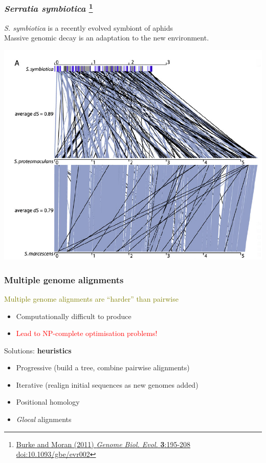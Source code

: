 \begin{frame}
  \frametitle{\textit{Serratia symbiotica} 
  \footnote{\tiny{\href{http://dx.doi.org/10.1093/gbe/evr002}{Burke and Moran (2011) \textit{Genome Biol. Evol.} \textbf{3}:195-208 doi:10.1093/gbe/evr002}}}
  }
  \textit{S. symbiotica} is a recently evolved symbiont of aphids\\
  \textcolor{hutton_purple}{Massive genomic decay is an adaptation to the new environment.}\\
  \begin{center}
    \includegraphics[width=0.75\textheight]{images/s_symbiotica}
  \end{center}    
\end{frame}

%
\begin{frame}
  \frametitle{Multiple genome alignments}
  \textcolor{olive}{Multiple genome alignments are ``harder'' than pairwise} \\
  \begin{itemize}
    \item Computationally difficult to produce
    \item \textcolor{red}{Lead to NP-complete optimisation problems!}
  \end{itemize}  
  \textcolor{hutton_green}{Solutions:} \textbf{heuristics}
  \begin{itemize}
    \item Progressive (build a tree, combine pairwise alignments)
    \item Iterative (realign initial sequences as new genomes added)
    \item \textcolor{hutton_blue}{Positional homology}
    \item \textcolor{hutton_purple}{\textit{Glocal} alignments}
  \end{itemize}  
\end{frame}

